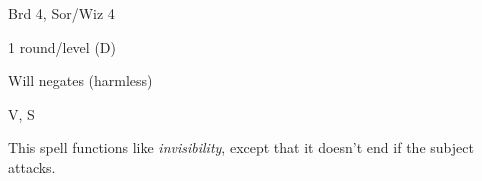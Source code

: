 
\begin{description*}
\item[Level:] Brd 4, Sor/Wiz 4
\item[Duration:] 1 round/level (D)
\item[Saving Throw:] Will negates (harmless)
\item[Components:] V, S
\end{description*}

This spell functions like \textit{invisibility}, except that it doesn't end if
the subject attacks.
